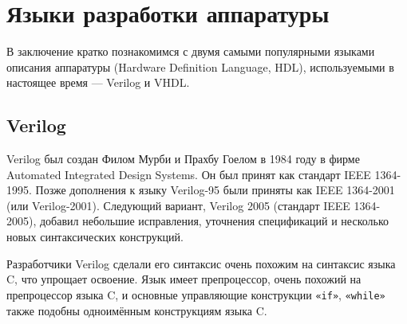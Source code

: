 




\section{Языки разработки аппаратуры}

В заключение кратко познакомимся с двумя самыми популярными языками описания аппаратуры (\abbr Hardware Definition Language, HDL), используемыми в настоящее время --- Verilog и VHDL.

\subsection{Verilog}
 
Verilog был создан Филом Мурби и Прахбу Гоелом в  1984 году в фирме Auto\-mated In\-te\-gra\-ted De\-sign Sys\-tems. Он был принят как стандарт IEEE 1364-1995. Позже дополнения к языку Verilog-95 были приняты как IEEE 1364-2001 (или Veri\-log-2001). Следующий вариант, Verilog 2005 (стандарт IEEE 1364-2005), добавил небольшие исправления, уточнения спецификаций и несколько новых синтаксических конструкций.

Разработчики Verilog сделали его синтаксис очень похожим на синтаксис языка C, что упрощает освоение. Язык имеет препроцессор, очень похожий на препроцессор языка C, и основные управляющие конструкции \texttt{«if»}, \texttt{«while»} также подобны одноимённым конструкциям языка C. 

